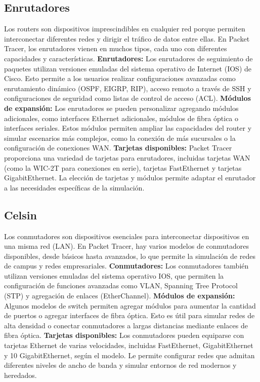 \documentclass[a4paper,12pt]{article}
\begin{document}
\subsection{Enrutadores}
Los routers son dispositivos imprescindibles en cualquier red porque permiten interconectar diferentes redes y dirigir el tráfico de datos entre ellas. En Packet Tracer, los enrutadores vienen en muchos tipos, cada uno con diferentes capacidades y características.
\textbf{Enrutadores:} 
Los enrutadores de seguimiento de paquetes utilizan versiones emuladas del sistema operativo de Internet (IOS) de Cisco. Esto permite a los usuarios realizar configuraciones avanzadas como enrutamiento dinámico (OSPF, EIGRP, RIP), acceso remoto a través de SSH y configuraciones de seguridad como listas de control de acceso (ACL).
\textbf{Módulos de expansión:}
Los enrutadores se pueden personalizar agregando módulos adicionales, como interfaces Ethernet adicionales, módulos de fibra óptica o interfaces seriales. Estos módulos permiten ampliar las capacidades del router y simular escenarios más complejos, como la conexión de más sucursales o la configuración de conexiones WAN.
\textbf{Tarjetas disponibles:} 
Packet Tracer proporciona una variedad de tarjetas para enrutadores, incluidas tarjetas WAN (como la WIC-2T para conexiones en serie), tarjetas FastEthernet y tarjetas GigabitEthernet. La elección de tarjetas y módulos permite adaptar el enrutador a las necesidades específicas de la simulación. 
\subsection{Celsin}
Los conmutadores son dispositivos esenciales para interconectar dispositivos en una misma red (LAN). En Packet Tracer, hay varios modelos de conmutadores disponibles, desde básicos hasta avanzados, lo que permite la simulación de redes de campus y redes empresariales.
\textbf{Conmutadores:} 
Los conmutadores también utilizan versiones emuladas del sistema operativo IOS, que permiten la configuración de funciones avanzadas como VLAN, Spanning Tree Protocol (STP) y agregación de enlaces (EtherChannel).
\textbf{Módulos de expansión:} 
Algunos modelos de switch permiten agregar módulos para aumentar la cantidad de puertos o agregar interfaces de fibra óptica. Esto es útil para simular redes de alta densidad o conectar conmutadores a largas distancias mediante enlaces de fibra óptica. 
\textbf{Tarjetas disponibles:}
Los conmutadores pueden equiparse con tarjetas Ethernet de varias velocidades, incluidas FastEthernet, GigabitEthernet y 10 GigabitEthernet, según el modelo. Le permite configurar redes que admitan diferentes niveles de ancho de banda y simular entornos de red modernos y heredados.
\end{document}
